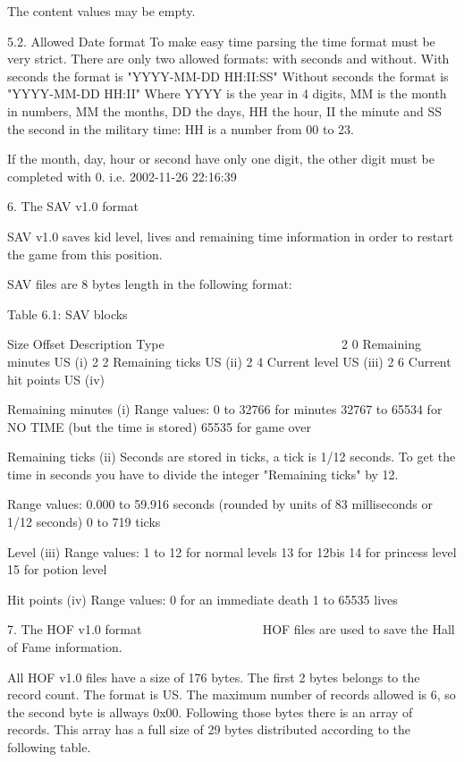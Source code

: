  The content values may be empty.

5.2. Allowed Date format
 To make easy time parsing the time format must be very strict.
 There are only two allowed formats: with seconds and without.
 With seconds the format is "YYYY-MM-DD HH:II:SS"
 Without seconds the format is "YYYY-MM-DD HH:II"
 Where YYYY is the year in 4 digits, MM is the month in numbers, MM the
 months, DD the days, HH the hour, II the minute and SS the second in the
 military time: HH is a number from 00 to 23.

 If the month, day, hour or second have only one digit, the other digit
 must be completed with 0.
 i.e. 2002-11-26 22:16:39


6. The SAV v1.0 format
   ~~~ ~~~ ~~~~ ~~~~~~

 SAV v1.0 saves kid level, lives and remaining time information in order to
 restart the game from this position.

 SAV files are 8 bytes length in the following format:

                   Table 6.1: SAV blocks
                   ~~~~~~~~~~~~~~~~~~~~~

   Size Offset Description                  Type
   ~~~~ ~~~~~~ ~~~~~~~~~~~                  ~~~~
      2      0 Remaining minutes            US   (i)
      2      2 Remaining ticks              US   (ii)
      2      4 Current level                US   (iii)
      2      6 Current hit points           US   (iv)

 Remaining minutes (i)
  Range values:
   0     to 32766 for minutes
   32767 to 65534 for NO TIME (but the time is stored)
   65535 for game over

 Remaining ticks (ii)
  Seconds are stored in ticks, a tick is 1/12 seconds. To get the time in
  seconds you have to divide the integer "Remaining ticks" by 12.

  Range values:
   0.000 to 59.916 seconds
                   (rounded by units of 83 milliseconds or 1/12 seconds)
   0     to 719    ticks

 Level (iii)
  Range values:
   1  to 12 for normal levels
   13 for 12bis
   14 for princess level
   15 for potion level

 Hit points (iv)
  Range values:
   0 for an immediate death
   1 to 65535 lives


7. The HOF v1.0 format
   ~~~ ~~~ ~~~~ ~~~~~~
 HOF files are used to save the Hall of Fame information.

 All HOF v1.0 files have a size of 176 bytes. The first 2 bytes belongs to
 the record count. The format is US. The maximum number of records allowed
 is 6, so the second byte is allways 0x00.
 Following those bytes there is an array of records. This array has a full
 size of 29 bytes distributed according to the following table.

